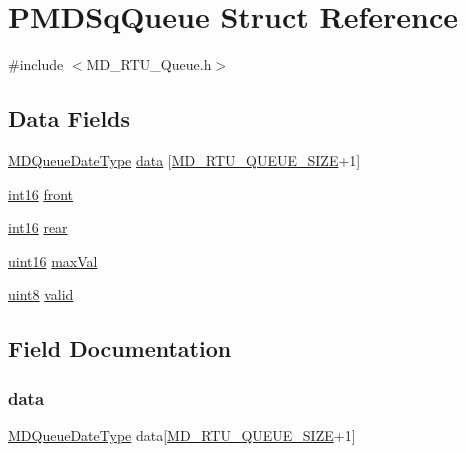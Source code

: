 \hypertarget{struct_p_m_d_sq_queue}{}\section{P\+M\+D\+Sq\+Queue Struct Reference}
\label{struct_p_m_d_sq_queue}


{\ttfamily \#include $<$M\+D\+\_\+\+R\+T\+U\+\_\+\+Queue.\+h$>$}

\subsection*{Data Fields}
\begin{DoxyCompactItemize}
\item 
\mbox{\hyperlink{_m_d___r_t_u___queue_8h_ae1eaa77a052a406c048506f2daf992e5}{M\+D\+Queue\+Date\+Type}} \mbox{\hyperlink{struct_p_m_d_sq_queue_aac1e116d6c43f051dcd0dcd8fb17444a}{data}} \mbox{[}\mbox{\hyperlink{_m_d___r_t_u___config_8h_a63144e8077cbf79b1ecffe46f1541dc6}{M\+D\+\_\+\+R\+T\+U\+\_\+\+Q\+U\+E\+U\+E\+\_\+\+S\+I\+ZE}}+1\mbox{]}
\item 
\mbox{\hyperlink{_m_d___r_t_u___type_8h_a4355d16fcf9f644c9ac84293f0b1801f}{int16}} \mbox{\hyperlink{struct_p_m_d_sq_queue_a69c2ccf666e0a3480064e9c162d5f4fb}{front}}
\item 
\mbox{\hyperlink{_m_d___r_t_u___type_8h_a4355d16fcf9f644c9ac84293f0b1801f}{int16}} \mbox{\hyperlink{struct_p_m_d_sq_queue_a9a1ba556d87c278a86e2a8dc90eb9fb7}{rear}}
\item 
\mbox{\hyperlink{_m_d___r_t_u___type_8h_a05f6b0ae8f6a6e135b0e290c25fe0e4e}{uint16}} \mbox{\hyperlink{struct_p_m_d_sq_queue_a8b13643a6b1fb0032a6d2b39cf902351}{max\+Val}}
\item 
\mbox{\hyperlink{_m_d___r_t_u___type_8h_adde6aaee8457bee49c2a92621fe22b79}{uint8}} \mbox{\hyperlink{struct_p_m_d_sq_queue_afc5dbcc47c15402566b656dca804146f}{valid}}
\end{DoxyCompactItemize}


\subsection{Field Documentation}
\mbox{\label{struct_p_m_d_sq_queue_aac1e116d6c43f051dcd0dcd8fb17444a}} 
\subsubsection{\texorpdfstring{data}{data}}
{\footnotesize\ttfamily \mbox{\hyperlink{_m_d___r_t_u___queue_8h_ae1eaa77a052a406c048506f2daf992e5}{M\+D\+Queue\+Date\+Type}} data\mbox{[}\mbox{\hyperlink{_m_d___r_t_u___config_8h_a63144e8077cbf79b1ecffe46f1541dc6}{M\+D\+\_\+\+R\+T\+U\+\_\+\+Q\+U\+E\+U\+E\+\_\+\+S\+I\+ZE}}+1\mbox{]}}

